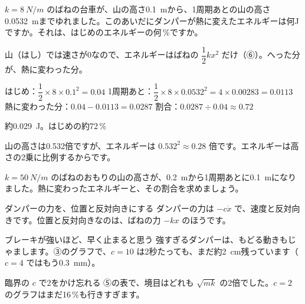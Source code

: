 \begin{reidai}[ダンパーが熱に変えたエネルギー]
$k=\qty{8}{N/m}$ のばねの台車が、山の高さ\qty{0.1}{m}から、1周期あとの山の高さ\qty{0.0532}{m}までゆれました。このあいだにダンパーが熱に変えたエネルギーは何Jですか。それは、はじめのエネルギーの何\,\%ですか。\par
\kangaekata 山（はし）では速さが0なので、エネルギーはばねの $\dfrac{1}{2}kx^2$ だけ（⑥）。へった分が、熱に変わった分。\par
\shiki
\kviha はじめ：$\dfrac{1}{2}\times8\times0.1^2=0.04$
\kviha 1周期あと：$\dfrac{1}{2}\times8\times0.0532^2=4\times0.00283=0.0113$
\kviha 熱に変わった分：$0.04-0.0113=0.0287$
\kviha 割合：$0.0287\div0.04\approx0.72$\par
\kotae 約\qty{0.029}{J}。はじめの約72\,\%
\end{reidai}
山の高さは0.532倍ですが、エネルギーは $0.532^2\approx0.28$ 倍です。エネルギーは高さの2乗に比例するからです。

\begin{jibun}
$k=\qty{50}{N/m}$ のばねのおもりの山の高さが、\qty{0.2}{m}から1周期あとに\qty{0.1}{m}になりました。熱に変わったエネルギーと、その割合を求めましょう。
\end{jibun}


\begin{tsumazuki}{ダンパーの力を、位置と反対向きにする}
ダンパーの力は $-c\dot x$ で、速度と反対向きです。位置と反対向きなのは、ばねの力 $-kx$ のほうです。
\end{tsumazuki}

\begin{tsumazuki}{ブレーキが強いほど、早く止まると思う}
強すぎるダンパーは、もどる動きもじゃまします。③のグラフで、$c=10$ は2秒たっても、まだ約\qty{2}{cm}残っています（$c=4$ ではもう\qty{0.3}{mm}）。
\end{tsumazuki}

\begin{tsumazuki}{臨界の $c$ で2をかけ忘れる}
⑤の表で、境目はどれも $\sqrt{mk}$ の2倍でした。$c=2$ のグラフはまだ16\,\%も行きすぎます。
\end{tsumazuki}

